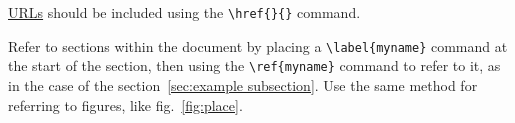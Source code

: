 \documentclass{newseye_del}
\begin{document}
\href{https://www.newseye.eu/}{URLs} should be included using the \verb.\href{}{}. command.

Refer to sections within the document by placing a \verb.\label{myname}.
command at the start of the section, then using the \verb.\ref{myname}.
command to refer to it, as in the case of the
section~\ref{sec:example subsection}. Use the same method for referring
to figures, like fig.~\ref{fig:place}.


\listoftodos{}



\newpage
\printbibliography
\end{document}
